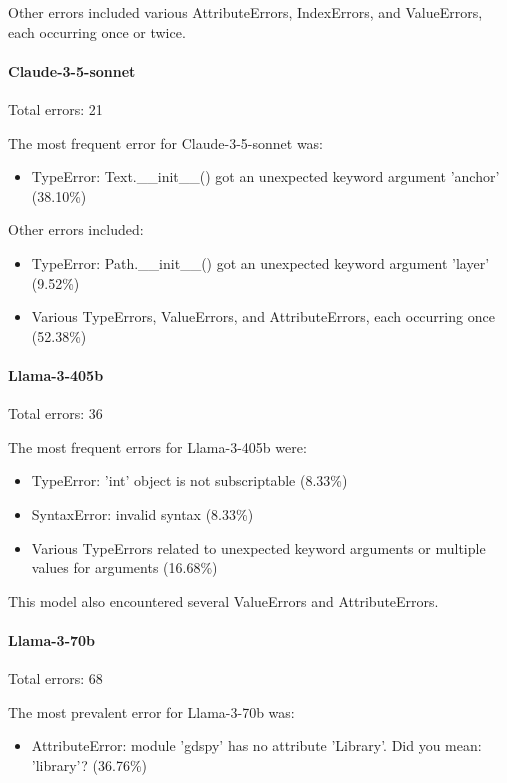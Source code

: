 \documentclass{article}
\begin{document}
Other errors included various AttributeErrors, IndexErrors, and ValueErrors, each occurring once or twice.

\paragraph{Claude-3-5-sonnet}
Total errors: 21

The most frequent error for Claude-3-5-sonnet was:
\begin{itemize}
    \item TypeError: Text.\_\_init\_\_() got an unexpected keyword argument 'anchor' (38.10\%)
\end{itemize}

Other errors included:
\begin{itemize}
    \item TypeError: Path.\_\_init\_\_() got an unexpected keyword argument 'layer' (9.52\%)
    \item Various TypeErrors, ValueErrors, and AttributeErrors, each occurring once (52.38\%)
\end{itemize}

\paragraph{Llama-3-405b}
Total errors: 36

The most frequent errors for Llama-3-405b were:
\begin{itemize}
    \item TypeError: 'int' object is not subscriptable (8.33\%)
    \item SyntaxError: invalid syntax (8.33\%)
    \item Various TypeErrors related to unexpected keyword arguments or multiple values for arguments (16.68\%)
\end{itemize}

This model also encountered several ValueErrors and AttributeErrors.

\paragraph{Llama-3-70b}
Total errors: 68

The most prevalent error for Llama-3-70b was:
\begin{itemize}
    \item AttributeError: module 'gdspy' has no attribute 'Library'. Did you mean: 'library'? (36.76\%)
\end{itemize}
\end{document}

